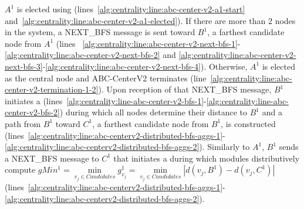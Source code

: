 $A^1$ is elected using \cheungIeCbAgg{} (lines~\ref{alg:centrality:line:abc-center-v2-a1-start} and~\ref{alg:centrality:line:abc-center-v2-a1-elected}). If there are more than 2 nodes in the system, a NEXT\_BFS message is sent toward $B^1$, a farthest candidate node from $A^1$ (lines ~\ref{alg:centrality:line:abc-center-v2-next-bfs-1}-\ref{alg:centrality:line:abc-center-v2-next-bfs-2} and \ref{alg:centrality:line:abc-center-v2-next-bfs-3}-\ref{alg:centrality:line:abc-center-v2-next-bfs-4}). Otherwise, $A^1$ is elected as the central node and ABC-CenterV2 terminates (line~\ref{alg:centrality:line:abc-center-v2-termination-1-2}). Upon reception of that NEXT\_BFS message, $B^1$ initiates a \cheungCbAgg{} (lines~\ref{alg:centrality:line-abc-center-v2-bfs-1}-\ref{alg:centrality:line-abc-center-v2-bfs-2}) during which all nodes determine their distance to $B^1$ and a path from $B^1$ toward $C^1$, a farthest candidate node from $B^1$, is constructed (lines~\ref{alg:centrality:line:abc-centerv2-distributed-bfs-aggs-1}-\ref{alg:centrality:line:abc-centerv2-distributed-bfs-aggs-2}). Similarly to $A^1$, $B^1$ sends a NEXT\_BFS message to $C^1$ that initiates a \cheungCbAgg{} during which modules distributively compute $gMin^1 = \min\limits_{v_j \in Candidates} g^1_{v_j} = \min\limits_{v_j \in Candidates} |d(v_j,B^1) - d(v_j,C^1)|$ (lines~\ref{alg:centrality:line:abc-centerv2-distributed-bfs-aggs-1}-\ref{alg:centrality:line:abc-centerv2-distributed-bfs-aggs-2}).

